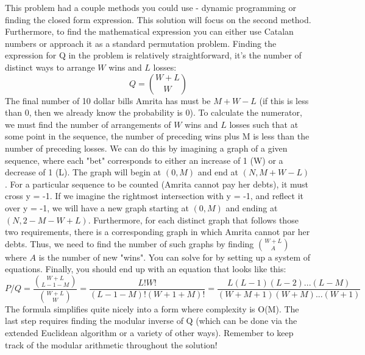 \documentclass{article}
\begin{document}
\noindent This problem had a couple methods you could use - dynamic programming or finding the closed form expression. This solution will focus on the second method. Furthermore, to find the mathematical expression you can either use Catalan numbers or approach it as a standard permutation problem. Finding the expression for Q in the problem is relatively straightforward, it's the number of distinct ways to arrange $W$ wins and $L$ losses:
\[Q = \binom{W+L}{W}\]
The final number of 10 dollar bills Amrita has must be $M + W - L$ (if this is less than 0, then we already know the probability is 0). To calculate the numerator, we must find the number of arrangements of $W$ wins and $L$ losses such that at some point in the sequence, the number of preceding wins plus M is less than the number of preceding losses. We can do this by imagining a graph of a given sequence, where each "bet" corresponds to either an increase of 1 (W) or a decrease of 1 (L). The graph will begin at $(0, M)$ and end at $(N, M + W - L)$. For a particular sequence to be counted (Amrita cannot pay her debts), it must cross y = -1. If we imagine the rightmost intersection with y = -1, and reflect it over y = -1, we will have a new graph starting at $(0, M)$ and ending at $(N, 2 - M - W + L)$. Furthermore, for each distinct graph that follows those two requirements, there is a corresponding graph in which Amrita cannot par her debts. Thus, we need to find the number of such graphs by finding $\binom{W+L}{A}$ where $A$ is the number of new "wins". You can solve for by setting up a system of equations. 
Finally, you should end up with an equation that looks like this:
\[P/Q =  \frac{\binom{W+L}{L-1-M}}{\binom{W+L}{W}} = \frac{L!W!}{(L-1-M)!(W+1+M)!} = \frac{L(L-1)(L-2)...(L-M)}{(W+M+1)(W+M)...(W+1)}\] 
The formula simplifies quite nicely into a form where complexity is O(M). The last step requires finding the modular inverse of Q (which can be done via the extended Euclidean algorithm or a variety of other ways). Remember to keep track of the modular arithmetic throughout the solution!
\end{document}
